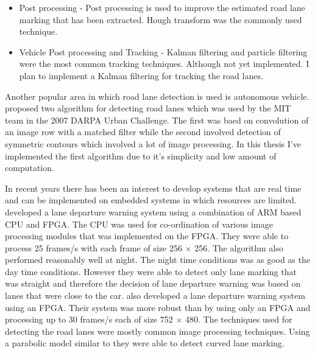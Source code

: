 \begin{itemize}
\begin{figure}
\begin{tabular}{c c}
    (a) & (b) \\
  \end{tabular}
  \caption{Scenes where edge detection would perform poorly}
  \label{fig:poor_edge_detection}
\end{figure}
\item Post processing - Post processing is used to improve the estimated road 
lane marking that has been extracted. Hough transform was the commonly used 
technique.  
\item Vehicle Post processing and Tracking - Kalman filtering and particle 
filtering were the most common tracking techniques. Although not yet 
implemented. I plan to implement a Kalman filtering for tracking the road lanes. 
\end{itemize}


Another popular area in which road lane detection is used is autonomous vehicle. 
 proposed two algorithm for detecting road lanes which 
was used by the MIT team in the 2007 DARPA Urban Challenge. The first was baed 
on convolution of an image row with a matched filter while the second involved 
detection of symmetric contours which involved a lot of image processing. In 
this thesis I've implemented the first algorithm due to it's simplicity and low 
amount of computation.

In recent years there has been an interest to develop systems that are real time 
and can be implemented on embedded systems in which resources are limited. 
 developed a lane departure warning system using a 
combination of ARM based CPU and FPGA. The CPU was used for co-ordination of 
various image processing modules that was implemented on the FPGA. They were 
able to process 25 frames/s with each frame of size 256 $\times$ 256. The 
algorithm also performed reasonably well at night. The night time conditions was 
as good as the day time conditions. However they were able to detect only lane 
marking that was straight and therefore the decision of lane departure warning 
was based on lanes that were close to the car.  also 
developed a lane departure warning system using an FPGA. Their system was more 
robust than  by using only an FPGA and processing up to 
30 frames/s each of size 752 $\times$ 480. The techniques used for detecting the 
road lanes were mostly common image processing techniques. Using a parabolic 
model similar to  they were able to detect curved lane 
marking. 


